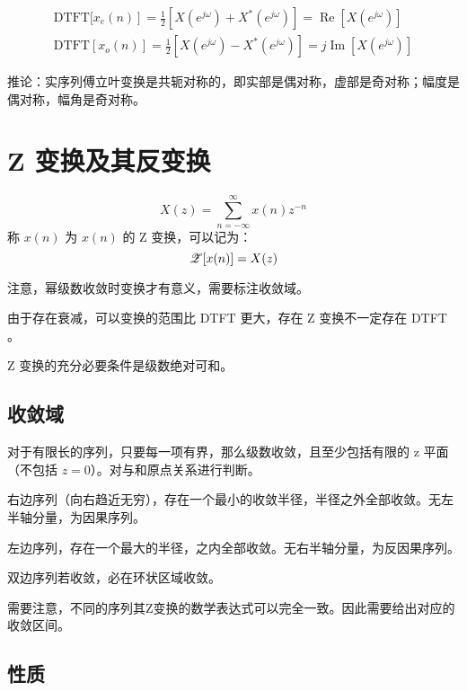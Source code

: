 \documentclass[cn,11pt,chinese,black,simple]{../elegantbook}
\begin{document}
\begin{equation}\begin{array}{l} 
    \text {DTFT[} \left.x_{e}(n)\right]=\frac{1}{2}\left[X\left(e^{j \omega}\right)+X^{*}\left(e^{j \omega}\right)\right]=\operatorname{Re}\left[X\left(e^{j \omega}\right)\right] \\
    \text {DTFT} \left[x_{o}(n)\right]=\frac{1}{2}\left[X\left(e^{j \omega}\right)-X^{*}\left(e^{j \omega}\right)\right]=j \operatorname{Im}\left[X\left(e^{j \omega}\right)\right]
\end{array}\end{equation}

推论：实序列傅立叶变换是共轭对称的，即实部是偶对称，虚部是奇对称；幅度是偶对称，幅角是奇对称。 %

\section{Z 变换及其反变换}

\begin{definition}[z 变换]
    \[X(z) = \sum_{n = -\infty}^\infty x(n)z^{-n}\] 
    称 \(x(n)\) 为 \(x(n)\) 的 Z 变换，可以记为：
    \[\mathscr{Z}[x(n)] = X(z)\]

    注意，幂级数收敛时变换才有意义，需要标注收敛域。
\end{definition}

由于存在衰减，可以变换的范围比 DTFT 更大，存在 Z 变换不一定存在 DTFT 。

Z 变换的充分必要条件是级数绝对可和。

\subsection{收敛域}

对于有限长的序列，只要每一项有界，那么级数收敛，且至少包括有限的 z 平面（不包括 \(z = 0\)）。对与和原点关系进行判断。

右边序列（向右趋近无穷），存在一个最小的收敛半径，半径之外全部收敛。无左半轴分量，为因果序列。

左边序列，存在一个最大的半径，之内全部收敛。无右半轴分量，为反因果序列。

双边序列若收敛，必在环状区域收敛。

需要注意，不同的序列其Z变换的数学表达式可以完全一致。因此需要给出对应的收敛区间。

\subsection{性质}
\end{document}
